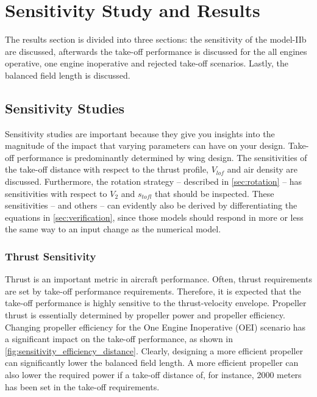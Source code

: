 \chapter{Sensitivity Study and Results}\label{chapter:results}
The results section is divided into three sections: the sensitivity of the model-IIb are discussed, afterwards the take-off performance is discussed for the all engines operative, one engine inoperative and rejected take-off scenarios. Lastly, the balanced field length is discussed.

\section{Sensitivity Studies}\label{sec:sensitivitystudies}
Sensitivity studies are important because they give you insights into the magnitude of the impact that varying parameters can have on your design. Take-off performance is predominantly determined by wing design. The sensitivities of the take-off distance with respect to the thrust profile, $V_{lof}$ and air density are discussed. Furthermore, the rotation strategy -- described in \autoref{sec:rotation} -- has sensitivities with respect to $V_2$ and $s_{tofl}$ that should be inspected.  These sensitivities -- and others -- can evidently also be derived by differentiating the equations in \autoref{sec:verification}, since those models should respond in more or less the same way to an input change as the numerical model.

\subsection{Thrust Sensitivity}\label{sec:sensitivity_thrust}
Thrust is an important metric in aircraft performance. Often, thrust requirements are set by take-off performance requirements. Therefore, it is expected that the take-off performance is highly sensitive to the thrust-velocity envelope. Propeller thrust is essentially determined by propeller power and propeller efficiency. Changing propeller efficiency for the One Engine Inoperative (OEI) scenario has a significant impact on the take-off performance, as shown in \autoref{fig:sensitivity_efficiency_distance}. Clearly, designing a more efficient propeller can significantly lower the balanced field length. A more efficient propeller can also lower the required power if a take-off distance of, for instance, 2000 meters has been set in the take-off requirements.

